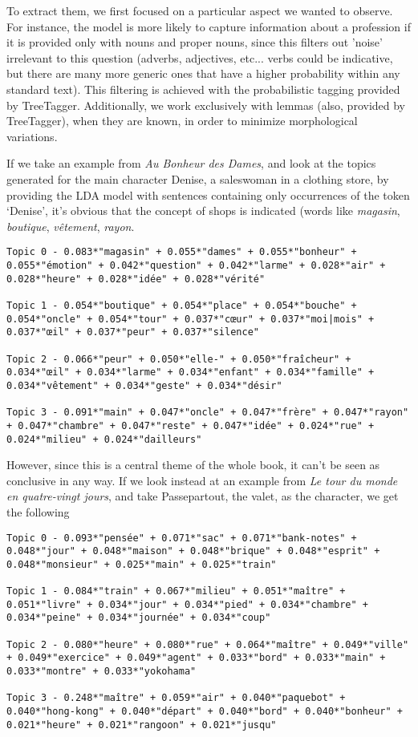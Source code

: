 To extract them, we first focused on a particular aspect we wanted to observe. For instance, the model is more likely to capture information about a profession if it is provided only with nouns and proper nouns, since this filters out 'noise' irrelevant to this question (adverbs, adjectives, etc... verbs could be indicative, but there are many more generic ones that have a higher probability within any standard text). This filtering is achieved with the probabilistic tagging provided by TreeTagger. Additionally, we work exclusively with lemmas (also, provided by TreeTagger), when they are known, in order to minimize morphological variations.

If we take an example from \textit{Au Bonheur des Dames}, and look at the topics generated for the main character Denise, a saleswoman in a clothing store, by providing the LDA model with sentences containing only occurrences of the token `Denise', it's obvious that the concept of shops is indicated (words like \textit{magasin}, \textit{boutique}, \textit{vêtement}, \textit{rayon}.

\begin{lstlisting}
Topic 0 - 0.083*"magasin" + 0.055*"dames" + 0.055*"bonheur" + 0.055*"émotion" + 0.042*"question" + 0.042*"larme" + 0.028*"air" + 0.028*"heure" + 0.028*"idée" + 0.028*"vérité"

Topic 1 - 0.054*"boutique" + 0.054*"place" + 0.054*"bouche" + 0.054*"oncle" + 0.054*"tour" + 0.037*"cœur" + 0.037*"moi|mois" + 0.037*"œil" + 0.037*"peur" + 0.037*"silence"

Topic 2 - 0.066*"peur" + 0.050*"elle-" + 0.050*"fraîcheur" + 0.034*"œil" + 0.034*"larme" + 0.034*"enfant" + 0.034*"famille" + 0.034*"vêtement" + 0.034*"geste" + 0.034*"désir"

Topic 3 - 0.091*"main" + 0.047*"oncle" + 0.047*"frère" + 0.047*"rayon" + 0.047*"chambre" + 0.047*"reste" + 0.047*"idée" + 0.024*"rue" + 0.024*"milieu" + 0.024*"dailleurs"
\end{lstlisting}

However, since this is a central theme of the whole book, it can't be seen as conclusive in any way. If we look instead at an example from \textit{Le tour du monde en quatre-vingt jours}, and take Passepartout, the valet, as the character, we get the following

\begin{lstlisting}
Topic 0 - 0.093*"pensée" + 0.071*"sac" + 0.071*"bank-notes" + 0.048*"jour" + 0.048*"maison" + 0.048*"brique" + 0.048*"esprit" + 0.048*"monsieur" + 0.025*"main" + 0.025*"train"

Topic 1 - 0.084*"train" + 0.067*"milieu" + 0.051*"maître" + 0.051*"livre" + 0.034*"jour" + 0.034*"pied" + 0.034*"chambre" + 0.034*"peine" + 0.034*"journée" + 0.034*"coup"

Topic 2 - 0.080*"heure" + 0.080*"rue" + 0.064*"maître" + 0.049*"ville" + 0.049*"exercice" + 0.049*"agent" + 0.033*"bord" + 0.033*"main" + 0.033*"montre" + 0.033*"yokohama"

Topic 3 - 0.248*"maître" + 0.059*"air" + 0.040*"paquebot" + 0.040*"hong-kong" + 0.040*"départ" + 0.040*"bord" + 0.040*"bonheur" + 0.021*"heure" + 0.021*"rangoon" + 0.021*"jusqu"
\end{lstlisting}

